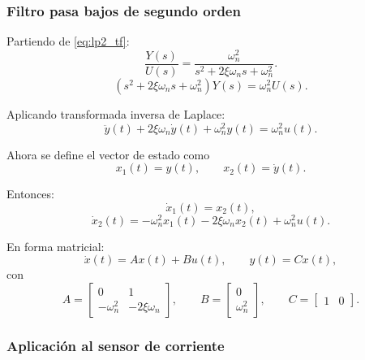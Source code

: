 \documentclass[12pt, a4paper,journal, onecolumn, compsoc]{IEEEtran}
\begin{document}
\subsubsection*{Filtro pasa bajos de segundo orden}

Partiendo de \eqref{eq:lp2_tf}:
\begin{equation}
    \frac{Y(s)}{U(s)}=\frac{\omega_n^2}{s^2+2\xi\omega_n s+\omega_n^2}.
\end{equation}
\begin{equation}
    (s^2+2\xi\omega_n s+\omega_n^2)Y(s)=\omega_n^2 U(s).
\end{equation}

Aplicando transformada inversa de Laplace:
\begin{equation}
    \ddot{y}(t)+2\xi\omega_n \dot{y}(t)+\omega_n^2 y(t)=\omega_n^2 u(t).
\end{equation}

Ahora se define el vector de estado como
\begin{equation}
    x_1(t)=y(t), \qquad x_2(t)=\dot{y}(t).
\end{equation}

Entonces:
\begin{equation}
    \dot{x}_1(t)=x_2(t),
\end{equation}
\begin{equation}
    \dot{x}_2(t)= -\omega_n^2 x_1(t)-2\xi\omega_n x_2(t)+\omega_n^2 u(t).
\end{equation}

En forma matricial:
\begin{equation}
    \dot{x}(t)=Ax(t)+Bu(t), \qquad y(t)=Cx(t),
\end{equation}
con
\begin{equation}
    A=
    \begin{bmatrix}
        0 & 1 \\
        -\omega_n^2 & -2\xi\omega_n
    \end{bmatrix},
    \qquad
    B=
    \begin{bmatrix}
        0 \\
        \omega_n^2
    \end{bmatrix},
    \qquad
    C=
    \begin{bmatrix}
        1 & 0
    \end{bmatrix}.
\end{equation}

\subsubsection*{Aplicación al sensor de corriente}
\end{document}
